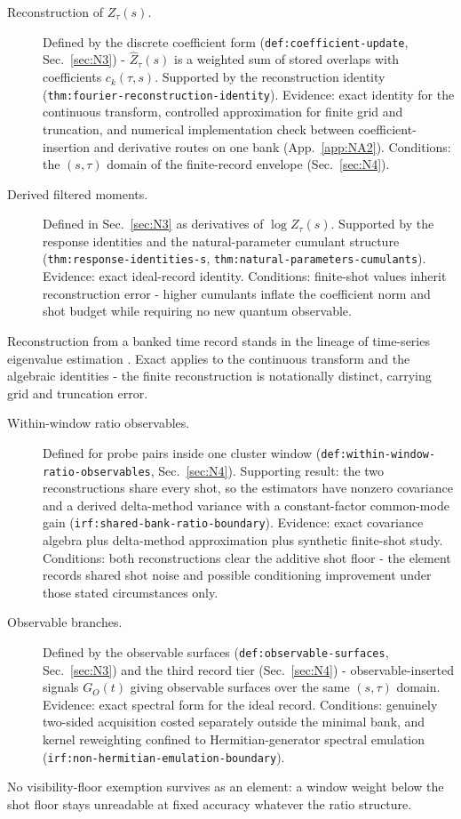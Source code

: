 \begin{description}
\item[Reconstruction of $Z_\tau(s)$.] Defined by the discrete coefficient form (\texttt{def:coefficient-update}, Sec.~\ref{sec:N3}) - $\widehat{Z}_\tau(s)$ is a weighted sum of stored overlaps with coefficients $c_k(\tau,s)$. Supported by the reconstruction identity (\texttt{thm:fourier-reconstruction-identity}). Evidence: exact identity for the continuous transform, controlled approximation for finite grid and truncation, and numerical implementation check between coefficient-insertion and derivative routes on one bank (App.~\ref{app:NA2}). Conditions: the $(s,\tau)$ domain of the finite-record envelope (Sec.~\ref{sec:N4}).
\item[Derived filtered moments.] Defined in Sec.~\ref{sec:N3} as derivatives of $\log Z_\tau(s)$. Supported by the response identities and the natural-parameter cumulant structure (\texttt{thm:response-identities-s}, \texttt{thm:natural-parameters-cumulants}). Evidence: exact ideal-record identity. Conditions: finite-shot values inherit reconstruction error - higher cumulants inflate the coefficient norm and shot budget while requiring no new quantum observable.
\end{description}
Reconstruction from a banked time record stands in the lineage of time-series eigenvalue estimation \cite{somma2019eigenvalue}. Exact applies to the continuous transform and the algebraic identities - the finite reconstruction is notationally distinct, carrying grid and truncation error.

\begin{description}
\item[Within-window ratio observables.] Defined for probe pairs inside one cluster window (\texttt{def:within-window-ratio-observables}, Sec.~\ref{sec:N4}). Supporting result: the two reconstructions share every shot, so the estimators have nonzero covariance and a derived delta-method variance with a constant-factor common-mode gain (\texttt{irf:shared-bank-ratio-boundary}). Evidence: exact covariance algebra plus delta-method approximation plus synthetic finite-shot study. Conditions: both reconstructions clear the additive shot floor - the element records shared shot noise and possible conditioning improvement under those stated circumstances only.
\item[Observable branches.] Defined by the observable surfaces (\texttt{def:observable-surfaces}, Sec.~\ref{sec:N3}) and the third record tier (Sec.~\ref{sec:N4}) - observable-inserted signals $G_O(t)$ giving observable surfaces over the same $(s,\tau)$ domain. Evidence: exact spectral form for the ideal record. Conditions: genuinely two-sided acquisition costed separately outside the minimal bank, and kernel reweighting confined to Hermitian-generator spectral emulation (\texttt{irf:non-hermitian-emulation-boundary}).
\end{description}
No visibility-floor exemption survives as an element: a window weight below the shot floor stays unreadable at fixed accuracy whatever the ratio structure.

